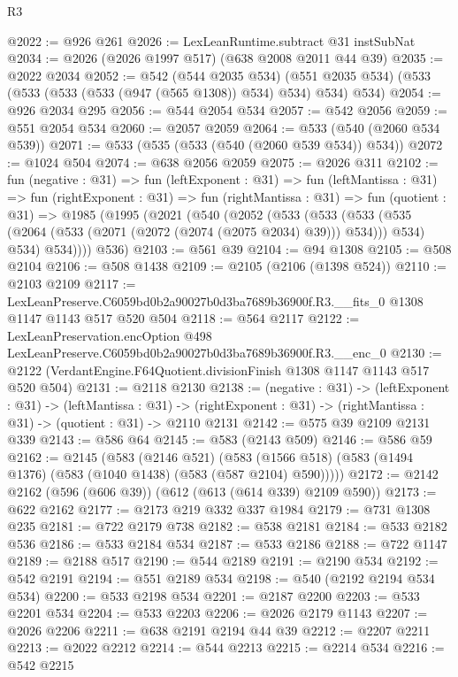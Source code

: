 \begin{lexlean}{R3}
\begin{coremodule}
@2022 := @926 @261
@2026 := LexLeanRuntime.subtract @31 instSubNat
@2034 := @2026 (@2026 @1997 @517) (@638 @2008 @2011 @44 @39)
@2035 := @2022 @2034
@2052 := @542
    (@544 @2035 @534)
    (@551 @2035 @534)
    (@533 (@533 (@533 (@533 (@947 (@565 @1308)) @534) @534) @534) @534)
@2054 := @926 @2034 @295
@2056 := @544 @2054 @534
@2057 := @542 @2056
@2059 := @551 @2054 @534
@2060 := @2057 @2059
@2064 := @533 (@540 (@2060 @534 @539))
@2071 := @533 (@535 (@533 (@540 (@2060 @539 @534)) @534))
@2072 := @1024 @504
@2074 := @638 @2056 @2059
@2075 := @2026 @311
@2102 := fun (negative : @31) =>
  fun (leftExponent : @31) =>
  fun (leftMantissa : @31) =>
  fun (rightExponent : @31) =>
  fun (rightMantissa : @31) =>
  fun (quotient : @31) =>
  @1985
    (@1995
      (@2021
        (@540
          (@2052
            (@533
              (@533
                (@533 (@535 (@2064 (@533 (@2071 (@2072 (@2074 (@2075 @2034) @39))) @534))) @534)
                @534)
              @534))))
      @536)
@2103 := @561 @39
@2104 := @94 @1308
@2105 := @508 @2104
@2106 := @508 @1438
@2109 := @2105 (@2106 (@1398 @524))
@2110 := @2103 @2109
@2117 := LexLeanPreserve.C6059bd0b2a90027b0d3ba7689b36900f.R3.__fits_0
    @1308
    @1147
    @1143
    @517
    @520
    @504
@2118 := @564 @2117
@2122 := LexLeanPreservation.encOption
    @498
    LexLeanPreserve.C6059bd0b2a90027b0d3ba7689b36900f.R3.__enc_0
@2130 := @2122 (VerdantEngine.F64Quotient.divisionFinish @1308 @1147 @1143 @517 @520 @504)
@2131 := @2118 @2130
@2138 := (negative : @31) ->
  (leftExponent : @31) ->
  (leftMantissa : @31) ->
  (rightExponent : @31) -> (rightMantissa : @31) -> (quotient : @31) -> @2110 @2131
@2142 := @575 @39 @2109 @2131 @339
@2143 := @586 @64
@2145 := @583 (@2143 @509)
@2146 := @586 @59
@2162 := @2145
    (@583
      (@2146 @521)
      (@583 (@1566 @518) (@583 (@1494 @1376) (@583 (@1040 @1438) (@583 (@587 @2104) @590)))))
@2172 := @2142 @2162 (@596 (@606 @39)) (@612 (@613 (@614 @339) @2109 @590))
@2173 := @622 @2162
@2177 := @2173 @219 @332 @337 @1984
@2179 := @731 @1308 @235
@2181 := @722 @2179 @738
@2182 := @538 @2181
@2184 := @533 @2182 @536
@2186 := @533 @2184 @534
@2187 := @533 @2186
@2188 := @722 @1147
@2189 := @2188 @517
@2190 := @544 @2189
@2191 := @2190 @534
@2192 := @542 @2191
@2194 := @551 @2189 @534
@2198 := @540 (@2192 @2194 @534 @534)
@2200 := @533 @2198 @534
@2201 := @2187 @2200
@2203 := @533 @2201 @534
@2204 := @533 @2203
@2206 := @2026 @2179 @1143
@2207 := @2026 @2206
@2211 := @638 @2191 @2194 @44 @39
@2212 := @2207 @2211
@2213 := @2022 @2212
@2214 := @544 @2213
@2215 := @2214 @534
@2216 := @542 @2215

\end{coremodule}
\end{lexlean}
